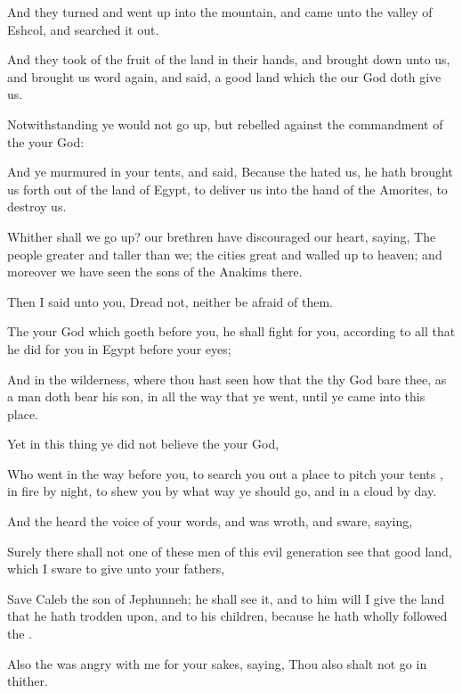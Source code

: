 {And they
turned and went
up into the
mountain, and
came unto the
valley of
Eshcol, and searched it
out.

And they
took of the
fruit of the
land in their
hands, and brought
{}
down unto us, and
brought us
word
again, and
said,
{} a
good
land which the
{} our
God doth
give us.

Notwithstanding ye
would not go
up, but
rebelled against the
commandment of the
{} your
God:

And ye
murmured in your
tents, and
said, Because the
{}
hated us, he hath brought us
forth out of the
land of
Egypt, to
deliver us into the
hand of the
Amorites, to
destroy us.

Whither shall we go
up? our
brethren have
discouraged our
heart,
saying, The
people
{}
greater and
taller than we; the
cities
{}
great and walled
up to
heaven; and moreover we have
seen the
sons of the
Anakims there.

Then I
said unto you,
Dread not, neither be
afraid of them.

The
{} your
God which
goeth
before you, he shall
fight for you, according to all that he
did for you in
Egypt before your
eyes;

And in the
wilderness, where thou hast
seen how that the
{} thy
God
bare thee, as a
man doth
bear his
son, in all the
way that ye
went, until ye
came into this
place.

Yet in this
thing ye did not
believe the
{} your
God,

Who
went in the
way
before you, to search you
out a
place to pitch your
tents
{}, in
fire by
night, to
shew you by what
way ye should
go, and in a
cloud by
day.

And the
{}
heard the
voice of your
words, and was
wroth, and
sware,
saying,

Surely there shall not
one of these
men of this
evil
generation
see that
good
land, which I
sware to
give unto your
fathers,

Save
Caleb the
son of
Jephunneh; he shall
see it, and to him will I
give the
land
that he hath trodden
upon, and to his
children, because he hath
wholly
followed the
{}.

Also the
{} was
angry with me for your
sakes,
saying, Thou also shalt not
go in
thither.

}

